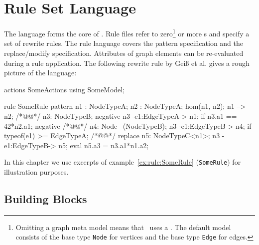 \chapter{Rule Set Language}
\label{chaprulelang}

The  language forms the core of \GrG. Rule files refer to zero\footnote{Omitting a graph meta model means that \GrG\ uses a . The default model consists of the base type \texttt{Node} for vertices and the base type \texttt{Edge} for edges.} or more s and specify a set of rewrite rules. The rule language covers the pattern specification and the replace/modify specification. Attributes of graph elements can be re-evaluated during a rule application. The following rewrite rule by Geiß et al. \cite{GBGHS:06} gives a rough picture of the language:
\begin{example}\label{ex:rule:SomeRule}
\begin{grgen}
actions SomeActions using SomeModel;

rule SomeRule {
  pattern {
    n1 : NodeTypeA;
    n2 : NodeTypeA;
    hom(n1, n2);
    n1 --> n2; /*@\label{ex:somerule:graphlet}@*/
    n3: NodeTypeB;
    negative {
      n3 -e1:EdgeTypeA-> n1;
      if {n3.a1 == 42*n2.a1;}
    }
    negative { /*@\label{ex:somerule:secondnac:begin}@*/
      n4: Node \ (NodeTypeB);
      n3 -e1:EdgeTypeB-> n4;
      if {typeof(e1) >= EdgeTypeA;}
    } /*@\label{ex:somerule:secondnac:end}@*/
  }
  replace {
    n5: NodeTypeC<n1>;
    n3 -e1:EdgeTypeB-> n5;
    eval {
      n5.a3 = n3.a1*n1.a2;
    }
  }  
}
\end{grgen}
\end{example}
In this chapter we use excerpts of example~\ref{ex:rule:SomeRule} (\texttt{SomeRule}) for illustration purposes.

\section{Building Blocks}
\label{rulebb}

